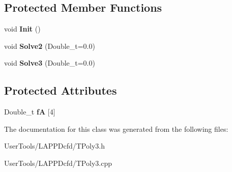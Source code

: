 \subsection*{Protected Member Functions}
\begin{DoxyCompactItemize}
\item 
\hypertarget{classTPoly3_afc59f60e93db4aab333d9511ba50768d}{
void {\bfseries Init} ()}
\label{classTPoly3_afc59f60e93db4aab333d9511ba50768d}

\item 
\hypertarget{classTPoly3_a85a916b893df2be2ee3ef91f37e9b615}{
void {\bfseries Solve2} (Double\_\-t=0.0)}
\label{classTPoly3_a85a916b893df2be2ee3ef91f37e9b615}

\item 
\hypertarget{classTPoly3_ac16b10b530319fd21fec63c69472f82f}{
void {\bfseries Solve3} (Double\_\-t=0.0)}
\label{classTPoly3_ac16b10b530319fd21fec63c69472f82f}

\end{DoxyCompactItemize}
\subsection*{Protected Attributes}
\begin{DoxyCompactItemize}
\item 
\hypertarget{classTPoly3_abf73a9e3bf2cbefca3e8d31344dd22ce}{
Double\_\-t {\bfseries fA} \mbox{[}4\mbox{]}}
\label{classTPoly3_abf73a9e3bf2cbefca3e8d31344dd22ce}

\end{DoxyCompactItemize}


The documentation for this class was generated from the following files:\begin{DoxyCompactItemize}
\item 
UserTools/LAPPDcfd/TPoly3.h\item 
UserTools/LAPPDcfd/TPoly3.cpp\end{DoxyCompactItemize}
